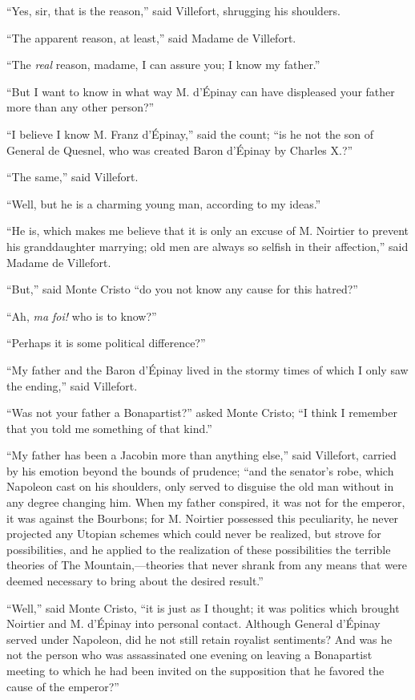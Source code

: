 “Yes, sir, that is the reason,” said Villefort, shrugging his
shoulders.

“The apparent reason, at least,” said Madame de Villefort.

“The \textit{real} reason, madame, I can assure you; I know my father.”

“But I want to know in what way M. d’Épinay can have displeased your
father more than any other person?”

“I believe I know M. Franz d’Épinay,” said the count; “is he not the
son of General de Quesnel, who was created Baron d’Épinay by Charles
X.?”

“The same,” said Villefort.

“Well, but he is a charming young man, according to my ideas.”

“He is, which makes me believe that it is only an excuse of M. Noirtier
to prevent his granddaughter marrying; old men are always so selfish in
their affection,” said Madame de Villefort.

“But,” said Monte Cristo “do you not know any cause for this hatred?”

“Ah, \textit{ma foi!} who is to know?”

“Perhaps it is some political difference?”

“My father and the Baron d’Épinay lived in the stormy times of which I
only saw the ending,” said Villefort.

“Was not your father a Bonapartist?” asked Monte Cristo; “I think I
remember that you told me something of that kind.”

“My father has been a Jacobin more than anything else,” said Villefort,
carried by his emotion beyond the bounds of prudence; “and the
senator’s robe, which Napoleon cast on his shoulders, only served to
disguise the old man without in any degree changing him. When my father
conspired, it was not for the emperor, it was against the Bourbons; for
M. Noirtier possessed this peculiarity, he never projected any Utopian
schemes which could never be realized, but strove for possibilities,
and he applied to the realization of these possibilities the terrible
theories of The Mountain,—theories that never shrank from any means
that were deemed necessary to bring about the desired result.”

“Well,” said Monte Cristo, “it is just as I thought; it was politics
which brought Noirtier and M. d’Épinay into personal contact. Although
General d’Épinay served under Napoleon, did he not still retain
royalist sentiments? And was he not the person who was assassinated one
evening on leaving a Bonapartist meeting to which he had been invited
on the supposition that he favored the cause of the emperor?”

